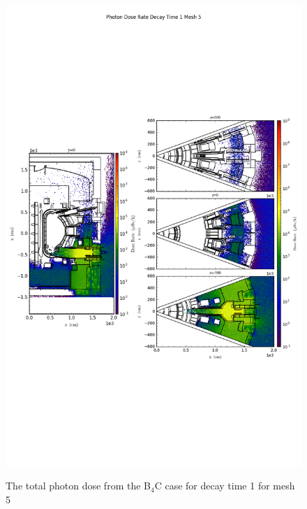 \begin{figure}[ht!]
\centering
\includegraphics[trim={0cm 9cm 0cm 10cm},clip,scale=0.75]{../plots/final_model_nob4c/Photon_Dose_Rate_Decay_Time_1_Mesh_5.png}
\label{fig:photons_dc1_no4bc_m5_flux}
\caption{The total photon dose from the B$_4$C case for decay time 1 for mesh 5}
\end{figure}
